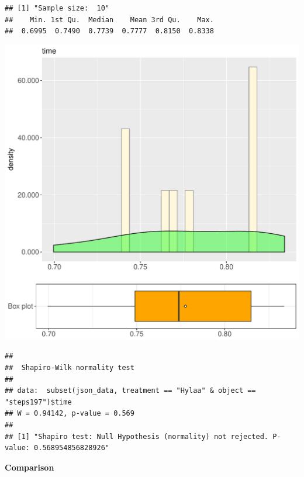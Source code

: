 \documentclass{article}\usepackage[]{graphicx}\usepackage[]{color}
\makeatletter
\def\maxwidth{ %
  \ifdim\Gin@nat@width>\linewidth
    \linewidth
  \else
    \Gin@nat@width
  \fi
}
\newenvironment{kframe}{%
 \def\at@end@of@kframe{}%
 \ifinner\ifhmode%
  \def\at@end@of@kframe{\end{minipage}}%
  \begin{minipage}{\columnwidth}%
 \fi\fi%
 \def\FrameCommand##1{\hskip\@totalleftmargin \hskip-\fboxsep
 \colorbox{shadecolor}{##1}\hskip-\fboxsep
     \hskip-\linewidth \hskip-\@totalleftmargin \hskip\columnwidth}%
 \MakeFramed {\advance\hsize-\width
   \@totalleftmargin\z@ \linewidth\hsize
   \@setminipage}}%
 {\par\unskip\endMakeFramed%
 \at@end@of@kframe}
\newenvironment{knitrout}{}{} %
\makeatother
\begin{document}
\begin{knitrout}
\color{fgcolor}\begin{kframe}
\begin{verbatim}
## [1] "Sample size:  10"
##    Min. 1st Qu.  Median    Mean 3rd Qu.    Max. 
##  0.6995  0.7490  0.7739  0.7777  0.8150  0.8338
\end{verbatim}
\end{kframe}
\includegraphics[width=\maxwidth]{figure/RH2_Hylaa_steps197-1} 
\begin{kframe}\begin{verbatim}
## 
## 	Shapiro-Wilk normality test
## 
## data:  subset(json_data, treatment == "Hylaa" & object == "steps197")$time
## W = 0.94142, p-value = 0.569
## 
## [1] "Shapiro test: Null Hypothesis (normality) not rejected. P-value: 0.568954856828926"
\end{verbatim}
\end{kframe}
\end{knitrout}
  
 \textbf{Comparison}
  
\end{document}
